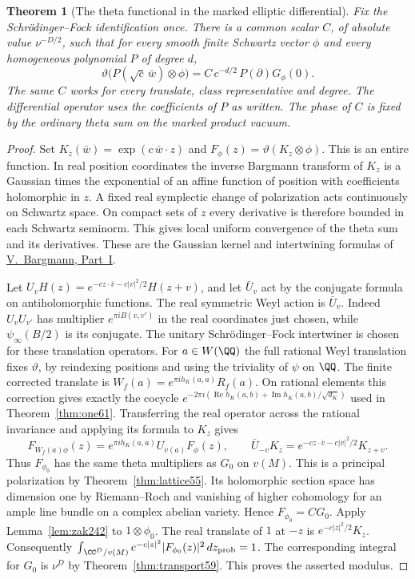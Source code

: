\documentclass[a4paper,11pt]{article}
\newtheorem{theorem}[proposition]{Theorem}
\theoremstyle{definition}
\theoremstyle{remark}
\newcommand{\real}{\operatorname{Re}}\newcommand{\imag}{\operatorname{Im}}
\numberwithin{equation}{section}
\begin{document}
\begin{theorem}[The theta functional in the marked elliptic differential]
\label{thm:vac242}
Fix the Schr\"odinger--Fock identification once. There is a common
scalar \(C\), of absolute value \(\nu^{-D/2}\), such that for every
smooth finite Schwartz vector \(\phi\) and every homogeneous
polynomial \(P\) of degree \(d\),
\[
 \vartheta\bigl(P(\sqrt c\,\bar w)\otimes\phi\bigr)
        =C\,c^{-d/2}\,P(\partial)G_\phi(0).
\]
The same \(C\) works for every translate, class representative and
degree. The differential operator uses the coefficients of \(P\)
as written. The phase of \(C\) is fixed by the ordinary theta sum on the marked product vacuum.
\end{theorem}
\begin{proof}
Set \(K_z(\bar w)=\exp(c\,\bar w\cdot z)\) and
\(F_\phi(z)=\vartheta(K_z\otimes\phi)\). This is an entire
function. In real position coordinates the inverse Bargmann
transform of \(K_z\) is a Gaussian times the exponential of an
affine function of position with coefficients holomorphic in \(z\).
A fixed real symplectic change of polarization acts continuously on
Schwartz space. On compact sets of \(z\) every derivative is
therefore bounded in each Schwartz seminorm. This gives local
uniform convergence of the theta sum and its derivatives. These
are the Gaussian kernel and intertwining formulas of
\href{https://doi.org/10.1002/cpa.3160140303}{V.~Bargmann, Part~I}.

Let \(U_vH(z)=e^{-cz\cdot\bar v-c|v|^2/2}H(z+v)\), and let
\(\bar U_v\) act by the conjugate formula on antiholomorphic
functions. The real symmetric Weyl action is \(\bar U_v\).
Indeed \(U_vU_{v'}\) has multiplier \(e^{\pi iB(v,v')}\)
in the real coordinates just chosen, while \(\psi_\infty(B/2)\)
is its conjugate. The unitary Schr\"odinger--Fock intertwiner is
chosen for these translation operators. For \(a\in W(\QQ)\)
the full rational Weyl translation fixes \(\vartheta\), by
reindexing positions and using the triviality of \(\psi\) on
\(\QQ\). The finite corrected translate is
\(W_f(a)=e^{\pi i h_K(a,a)}R_f(a)\). On rational elements this
correction gives exactly the cocycle
\(e^{-2\pi i(\real h_K(a,b)+\imag h_K(a,b)/\sqrt{d_K})}\)
used in Theorem~\ref{thm:one61}. Transferring the real operator
across the rational invariance and applying its formula to \(K_z\)
gives
\[
 F_{W_f(a)\phi}(z)=e^{\pi i h_K(a,a)}U_{v(a)} F_\phi(z),
 \qquad
 \bar U_{-v}K_z=e^{-cz\cdot\bar v-c|v|^2/2}K_{z+v}.
\]
Thus \(F_{\phi_0}\) has the same theta multipliers as \(G_0\) on
\(v(M)\). This is a principal polarization by
Theorem~\ref{thm:lattice55}. Its holomorphic section space has
dimension one by Riemann--Roch and vanishing of higher cohomology
for an ample line bundle on a complex abelian variety. Hence
\(F_{\phi_0}=C G_0\). Apply Lemma~\ref{lem:zak242} to
\(1\otimes\phi_0\). The real translate of \(1\) at \(-z\) is
\(e^{-c|z|^2/2}K_z\). Consequently
\(\int_{\,\CC^D/v(M)} e^{-c|z|^2}|F_{\phi_0}(z)|^2\,dz_{\rm prob}=1\).
The corresponding integral for \(G_0\) is \(\nu^D\) by
Theorem~\ref{thm:transport59}. This proves the asserted modulus.


\end{proof}
\end{document}
